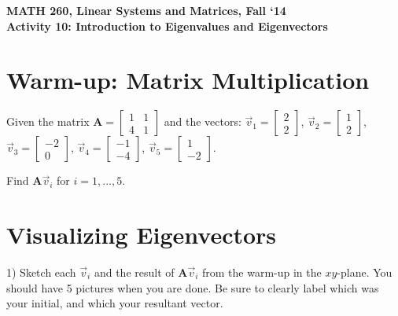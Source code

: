 \documentclass{article}
\begin{document}
\begin{flushleft}
	\bfseries{MATH 260, Linear Systems and Matrices, Fall `14}\\
	\bfseries{Activity 10:  Introduction to Eigenvalues and Eigenvectors}\\
\end{flushleft}

\begin{flushleft}

\section*{Warm-up:  Matrix Multiplication}

Given the matrix 
$\textbf{A}=
\begin{bmatrix} 
1 & 1 \\ 4&1 
\end{bmatrix}$
 and the vectors: 
$\vec{v}_1=\begin{bmatrix} 2 \\ 2 \end{bmatrix}$, 
$\vec{v}_2=\begin{bmatrix} 1 \\ 2 \end{bmatrix}$,
$\vec{v}_3=\begin{bmatrix} -2 \\ 0 \end{bmatrix}$, 
$\vec{v}_4=\begin{bmatrix} -1 \\ -4 \end{bmatrix}$, 
$\vec{v}_5=\begin{bmatrix} 1 \\ -2 \end{bmatrix}$.

\vspace{0.1in}

Find $\textbf{A}\vec{v}_i$ for $i=1,...,5$. 

\vspace{2in}

\newpage

\section*{Visualizing Eigenvectors}

1) Sketch each $\vec{v}_i$ and the result of $\textbf{A}\vec{v}_i$ from the warm-up in the $xy$-plane. You should have 5 pictures when you are done. Be sure to clearly label which was your initial, and which your resultant vector. 


\end{flushleft}
\end{document}
